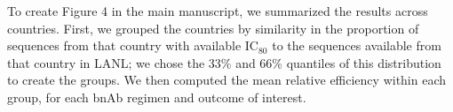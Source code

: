 \documentclass[10pt]{article}
\begin{document}
To create Figure 4 in the main manuscript, we summarized the results across countries. First, we grouped the countries by similarity in the proportion of sequences from that country with available IC$_{80}$ to the sequences available from that country in LANL; we chose the 33\% and 66\% quantiles of this distribution to create the groups. We then computed the mean relative efficiency within each group, for each bnAb regimen and outcome of interest.


\end{document}
